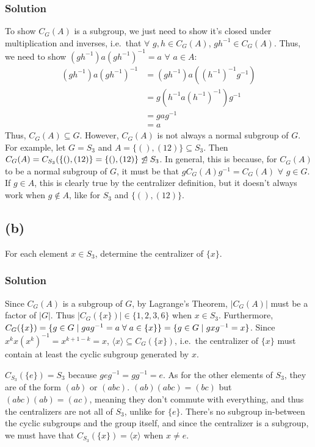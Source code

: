 \documentclass[fleqn]{article}
\begin{document}
            \subsubsection{Solution}
            To show $C_G(A)$ is a subgroup, we just need to show it's closed under multiplication and inverses, i.e.\ that $\forall$ $g, h \in C_G(A)$, $gh^{-1} \in C_G(A)$.  Thus, we need to show $(gh^{-1})a(gh^{-1})^{-1} = a$ $\forall$ $a \in A$:
            \begin{align}
                (gh^{-1})a(gh^{-1})^{-1} 
                    &= (gh^{-1})a\left((h^{-1})^{-1}g^{-1}\right) \\
                    &= g\left(h^{-1}a(h^{-1})^{-1}\right)g^{-1} \\
                    &= gag^{-1} \\
                    &= a
            \end{align}
            Thus, $C_G(A) \subseteq G$.  However, $C_G(A)$ is not always a normal subgroup of $G$.  For example, let $G = S_3$ and $A = \{(), (12)\} \subseteq S_3$.  Then $C_G(A) = C_{S_3}(\{(), (12)\} = \{(), (12)\} \centernot{\unlhd} S_3$.  In general, this is because, for $C_G(A)$ to be a normal subgroup of $G$, it must be that $g C_G(A) g^{-1} = C_G(A)$ $\forall$ $g \in G$.  If $g \in A$, this is clearly true by the centralizer definition, but it doesn't always work when $g \notin A$, like for $S_3$ and $\{(), (12)\}$.
        
        \subsection{(b)}
        For each element $x \in S_3$, determine the centralizer of $\{x\}$.
            
            \subsubsection{Solution}
            Since $C_G(A)$ is a subgroup of $G$, by Lagrange's Theorem, $|C_G(A)|$ must be a factor of $|G|$.  Thus $|C_G(\{x\})| \in \{1, 2, 3, 6\}$ when $x \in S_3$.  Furthermore, $C_G(\{x\}) = \{g \in G \mid gag^{-1} = a \thickspace \forall \thickspace a \in \{x\}\} = \{g \in G \mid gxg^{-1} = x\}$.  Since $x^k x (x^k)^{-1} = x^{k + 1 - k} = x$, $\langle x \rangle \subseteq C_G(\{x\})$, i.e.\ the centralizer of $\{x\}$ must contain at least the cyclic subgroup generated by $x$.
            
            $C_{S_3}(\{e\}) = S_3$ because $geg^{-1} = gg^{-1} = e$.  As for the other elements of $S_3$, they are of the form $(ab)$ or $(abc)$.  $(ab)(abc) = (bc)$ but $(abc)(ab) = (ac)$, meaning they don't commute with everything, and thus the centralizers are not all of $S_3$, unlike for $\{e\}$.  There's no subgroup in-between the cyclic subgroups and the group itself, and since the centralizer is a subgroup, we must have that $C_{S_3}(\{x\}) = \langle x \rangle$ when $x \neq e$.
    
\end{document}

